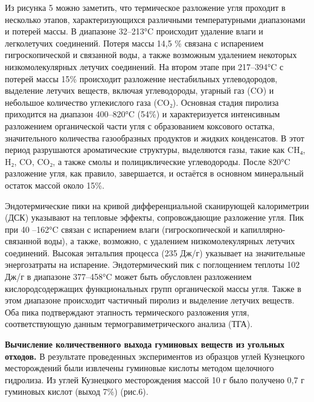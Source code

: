 \begin{multicols}{2}
Из рисунка 5 можно заметить, что термическое разложение угля проходит в
несколько этапов, характеризующихся различными температурными
диапазонами и потерей массы. В диапазоне 32--213°C происходит удаление
влаги и легколетучих соединений. Потеря массы 14,5 \% связана с
испарением гигроскопической и связанной воды, а также возможным
удалением некоторых низкомолекулярных летучих соединений. На втором
этапе при 217--394°C с потерей массы 15\% происходит разложение
нестабильных углеводородов, выделение летучих веществ, включая
углеводороды, угарный газ (CO) и небольшое количество углекислого газа
(CO₂). Основная стадия пиролиза приходится на диапазон 400--820°C (54\%)
и характеризуется интенсивным разложением органической части угля с
образованием коксового остатка, значительного количества газообразных
продуктов и жидких конденсатов. В этот период разрушаются ароматические
структуры, выделяются газы, такие как CH₄, H₂, CO, CO₂, а также смолы и
полициклические углеводороды. После 820°C разложение угля, как правило,
завершается, и остаётся в основном минеральный остаток массой около
15\%.

Эндотермические пики на кривой дифференциальной сканирующей калориметрии
(ДСК) указывают на тепловые эффекты, сопровождающие разложение угля. Пик
при 40 --162°C связан с испарением влаги (гигроскопической и
капиллярно-связанной воды), а также, возможно, с удалением
низкомолекулярных летучих соединений. Высокая энтальпия процесса (235
Дж/г) указывает на значительные энергозатраты на испарение.
Эндотермический пик с поглощением теплоты 102 Дж/г в диапазоне
377--458°C может быть обусловлен разложением кислородсодержащих
функциональных групп органической массы угля. Также в этом диапазоне
происходит частичный пиролиз и выделение летучих веществ. Оба пика
подтверждают этапность термического разложения угля, соответствующую
данным термогравиметрического анализа (ТГА).

{\bfseries Вычисление количественного выхода гуминовых веществ из угольных
отходов.} В результате проведенных экспериментов из образцов углей
Кузнецкого месторождений были извлечены гуминовые кислоты методом
щелочного гидролиза. Из углей Кузнецкого месторождения массой 10 г было
получено 0,7 г гуминовых кислот (выход 7\%) (рис.6).
\end{multicols}

